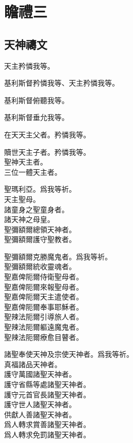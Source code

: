 \chapter[瞻禮三]{瞻禮三}
\section{天神禱文}
\versicle 天主矜憐我等。

\Response 基利斯督矜憐我等、天主矜憐我等。

\versicle 基利斯督俯聽我等。

\Response 基利斯督垂允我等。

\versicle 在天天主父者。\hfill \response 矜憐我等。

\versicle 贖世天主子者。\hfill \response 矜憐我等。\\
聖神天主者。\\
三位一體天主者。

\versicle 聖瑪利亞。\hfill \response 爲我等祈。\\
天主聖母。\\
諸童身之聖童身者。\\
諸天神之母皇。\\
聖彌額爾總領天神者。\\
聖彌額爾護守聖教者。

\versicle 聖彌額爾克勝魔鬼者。\hfill \response 爲我等祈。\\
聖彌額爾統收靈魂者。\\
聖嘉俾阨爾侍衛聖母者。\\
聖嘉俾阨爾來報聖母者。\\
聖嘉俾阨爾天主遣使者。\\
聖嘉俾阨爾奉事耶穌者。\\
聖辣法阨爾引導旅人者。\\
聖辣法阨爾軀遠魔鬼者。\\
聖辣法阨爾療愈目瞽者。

\versicle 諸聖奉使天神及宗使天神者。\hfill \response 爲我等祈。\\
真福諸品天神者。\\
護守萬國諸聖天神者。\\
護守省縣等處諸聖天神者。\\
護守元首官長諸聖天神者。\\
護守世人諸聖天神者。\\
供獻人善諸聖天神者。\\
爲人轉求賞善諸聖天神者。\\
爲人轉求免罰諸聖天神者。

